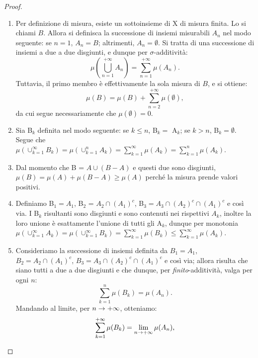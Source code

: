 \documentclass[Completo.tex]{subfiles}
\begin{document}
	\begin{proof}
		\begin{enumerate}
			\item Per definizione di misura, esiste un sottoinsieme di X di misura finita. Lo si chiami $B$. Allora si definisca la successione di insiemi misurabili $A_n$ nel modo seguente: se $n = 1$, $A_n = B$; altrimenti, $A_n = \emptyset$. Si tratta di una successione di insiemi a due a due disgiunti, e dunque per $\sigma$-additività:
			\begin{equation*}
			\mu\left(\bigcup_{n =1}^{+\infty} A_n\right) = \sum_{n = 1}^{+\infty} \mu(A_n).
			\end{equation*}
			Tuttavia, il primo membro è effettivamente la sola misura di $B$, e si ottiene:
			\begin{equation*}
			\mu(B) = \mu(B) + \sum_{n=2}^{+\infty} \mu(\emptyset),
			\end{equation*}
			da cui segue necessariamente che $\mu(\emptyset) = 0$.
			\item Sia B$_k$ definita nel modo seguente: se $k \leq n$, B$_k =$ A$_k$; se $k > n$, B$_k = \emptyset$. Segue che $\mu(\cup_{k=1}^{\infty} B_k) = \mu(\cup_{k=1}^{n} A_k)= \sum_{k=1}^{\infty} \mu(A_k) = \sum_{k=1}^{n} \mu(A_k)$.
			\item Dal momento che B = $ A \cup (B-A)$ e questi due sono disgiunti, $\mu(B) = \mu(A) + \mu(B-A) \geq \mu(A)$ perché la misura prende valori positivi.
			\item Definiamo B$_1 = A_1$, B$_2$ = $A_2 \cap (A_1)^{c}$, B$_3 = A_3 \cap (A_2)^{c} \cap (A_1)^{c}$ e così via. I B$_k$ risultanti sono disgiunti e sono contenuti nei rispettivi $A_k$, inoltre la loro unione è esattamente l'unione di tutti gli A$_k$, dunque per monotonia $\mu(\cup_{k=1}^{\infty}A_k) = \mu(\cup_{k=1}^{\infty} B_k) = \sum_{k=1}^{\infty} \mu(B_k) \leq \sum_{k=1}^{\infty} \mu(A_k)$.
			\item Consideriamo la successione di insiemi definita da $B_1 = A_1$, $B_2 = A_2 \cap (A_1)^{c}$, $B_3 = A_3 \cap (A_2)^{c} \cap (A_1)^{c}$ e così via; allora risulta che siano tutti a due a due disgiunti e che dunque, per \textit{finito}-additività, valga per ogni $n$:
			\begin{equation*}
			\sum_{k=1}^{n} \mu(B_k) = \mu(A_n).
			\end{equation*}
			Mandando al limite, per $n \rightarrow +\infty$, otteniamo:
			\begin{equation*}
			\sum_{k=1}^{+\infty} \mu(B_k) = \lim_{n \rightarrow +\infty} \mu(A_n),
			\end{equation*}

\end{enumerate}
\end{proof}
\end{document}
